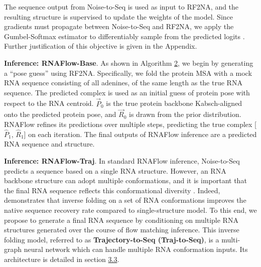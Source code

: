 The sequence output from Noise-to-Seq is used as input to RF2NA, and the resulting structure is supervised to update the weights of the model. Since gradients must propagate between Noise-to-Seq and RF2NA, we apply the Gumbel-Softmax estimator to differentiably sample from the predicted logits \cite{jang2016categorical}. Further justification of this objective is given in the Appendix. 

\textbf{Inference: RNAFlow-Base}. As shown in Algorithm \hyperref[rnaflow:inference]{2}, we begin by generating a ``pose guess'' using RF2NA. Specifically, we fold the protein MSA with a mock RNA sequence consisting of all adenines, of the same length as the true RNA sequence. The predicted complex is used as an initial guess of protein pose with respect to the RNA centroid. $\vec P_0$ is the true protein backbone Kabsch-aligned onto the predicted protein pose, and $\vec R_0$ is drawn from the prior distribution. RNAFlow refines its predictions over multiple steps, predicting the true complex [$\hat P_1$, $\hat R_1$] on each iteration. The final outputs of RNAFlow inference are a predicted RNA sequence and structure.

\textbf{Inference: RNAFlow-Traj}. In standard RNAFlow inference, Noise-to-Seq predicts a sequence based on a single RNA structure. However, an RNA backbone structure can adopt multiple conformations, and it is important that the final RNA sequence reflects this conformational diversity \cite{ganser2019roles}. Indeed, \citet{joshi2023multi} demonstrates that inverse folding on a set of RNA conformations improves the native sequence recovery rate compared to single-structure model.
To this end, we propose to generate a final RNA sequence by conditioning on multiple RNA structures generated over the course of flow matching inference. This inverse folding model, referred to as \textbf{Trajectory-to-Seq (Traj-to-Seq)}, is a multi-graph neural network which can handle multiple RNA conformation inputs. Its architecture is detailed in section \hyperref[sec:3.3]{3.3}.

